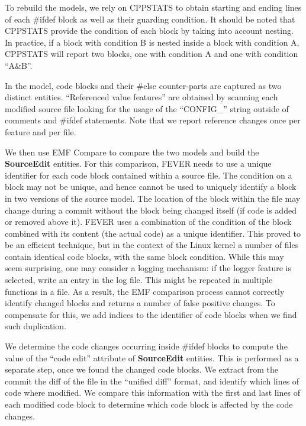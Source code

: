 To rebuild the models, we rely on CPPSTATS \citep{liebig_analysis_2010} to obtain 
starting and ending lines of each  \#ifdef block as well as their guarding condition. 
It should be noted that CPPSTATS provide the condition of each block by taking into account nesting.
In practice, if a block with condition B is nested inside a block with condition A, CPPSTATS will 
report two blocks, one with condition A and one with condition ``A\&B''.

In the model, code blocks and their \#else counter-parts are captured as two distinct entities.
``Referenced value features'' are obtained by scanning each modified source file looking for the usage 
of the ``CONFIG\_'' string outside of comments and \#ifdef statements.
Note that we report reference changes once per feature and per file.

We then use EMF Compare to compare the two models and build the \textbf{SourceEdit} entities.
For this comparison, FEVER needs to use a unique identifier for each code block contained within a source file. 
The condition on a block may not be unique, and hence cannot be used to uniquely identify a block in 
two versions of the source model.
The location of the block within the file may change during a commit without the block being changed itself
(\ie if code is added or removed above it).
FEVER uses a combination of the condition of the block combined with its content (the actual code)
as a unique identifier.
This proved to be an efficient technique, but in the context of the Linux kernel a number of files 
contain identical code blocks, with the same block condition.
While this may seem surprising, one may consider a logging mechanism: if the logger feature is selected, write an entry in the log file.
This might be repeated in multiple functions in a file. 
As a result, the EMF comparison process cannot correctly identify changed blocks and returns a number of false positive changes.
To compensate for this, we add indices to the identifier of code blocks when we find such duplication.

We determine the code changes occurring inside \#ifdef blocks to compute the value of the ``code edit'' attribute of 
\textbf{SourceEdit} entities.
This is performed as a separate step, once we found the changed code blocks.
We extract from the commit the diff of the file in the ``unified diff'' format, and identify which lines of code where modified.
We compare this information with the first and last lines of each modified code block to determine 
which code block is affected by the code changes.

